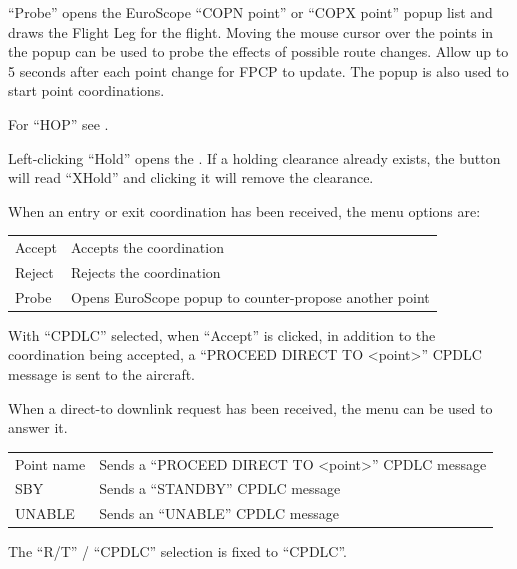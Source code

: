 \documentclass[a4paper,oneside,11pt]{memoir}
\begin{document}
\bigskip

“Probe” opens the EuroScope “COPN point” or “COPX point” popup list and draws the Flight Leg for the flight. Moving the mouse cursor over the points in the popup can be used to probe the effects of possible route changes. Allow up to 5 seconds after each point change for FPCP to update. The popup is also used to start point coordinations.

\bigskip

For “HOP” see .

\bigskip

Left-clicking “Hold” opens the . If a holding clearance already exists, the button will read “XHold” and clicking it will remove the clearance.


When an entry or exit coordination has been received, the menu options are:

\begin{longtable}{p{5cm} p{7.5cm}}
Accept                    & Accepts the coordination\\
Reject                    & Rejects the coordination\\
Probe                     & Opens EuroScope popup to counter-propose another point\\
\end{longtable}

With “CPDLC” selected, when “Accept” is clicked, in addition to the coordination being accepted, a “PROCEED DIRECT TO <point>” CPDLC message is sent to the aircraft.


When a direct-to downlink request has been received, the menu can be used to answer it.

\bigskip

\begin{longtable}{p{5cm} p{7.5cm}}
Point name  & Sends a “PROCEED DIRECT TO <point>” CPDLC message\\
SBY         & Sends a “STANDBY” CPDLC message\\
UNABLE      & Sends an “UNABLE” CPDLC message\\
\end{longtable}   

\bigskip

The “R/T” / “CPDLC” selection is fixed to “CPDLC”.

\end{document}
